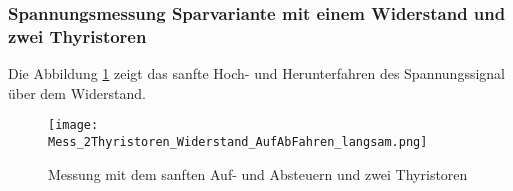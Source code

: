 \newpage
\subsubsection{Spannungsmessung Sparvariante mit einem Widerstand und zwei Thyristoren}

Die Abbildung \ref{fig:Mess_2Thyristoren_Widerstand_AufAbFahren_langsam} zeigt das sanfte Hoch- und Herunterfahren des Spannungssignal über dem Widerstand. 

\begin{figure}[ht!]
	\centering
	\texttt{[image: Mess\_2Thyristoren\_Widerstand\_AufAbFahren\_langsam.png]}	
	\caption{Messung mit dem sanften Auf- und Absteuern und zwei Thyristoren}\label{fig:Mess_2Thyristoren_Widerstand_AufAbFahren_langsam}	
\end{figure}


